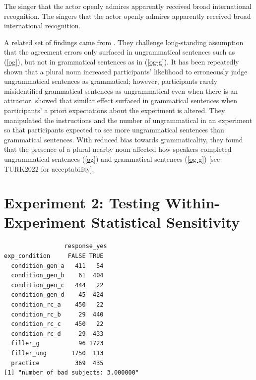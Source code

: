 \documentclass[
  authoryear,
  3p]{elsarticle}
\begin{document}
\begin{exe}
\ex \label{malsburg}
\begin{xlist}
\ex \label{malsburg-singer} The singer that the actor openly admires apparently received broad international recognition.
\ex \label{malsburg-singers} The singers that the actor openly admires apparently received broad international recognition.
\end{xlist}
\end{exe}

A related set of findings came from \citet{HammerlyEtAl2019}. They
challenge long-standing assumption that the agreement errors only
surfaced in ungrammatical sentences such as (\ref{og}), but not in
grammatical sentences as in (\ref{og-g}). It has been repeatedly shown
that a plural noun increased participants' likelihood to erroneously
judge ungrammatical sentences as grammatical; however, participants
rarely misidentified grammatical sentences as ungrammatical even when
there is an attractor. \citet{HammerlyEtAl2019} showed that similar
effect surfaced in grammatical sentences when participants' a priori
expectations about the experiment is altered. They manipulated the
instructions and the number of ungrammatical in an experiment so that
participants expected to see more ungrammatical sentences than
grammatical sentences. With reduced bias towards grammaticality, they
found that the presence of a plural nearby noun affected how speakers
completed ungrammatical sentences (\ref{og}) and grammatical sentences
(\ref{og-g}) {[}see TURK2022 for acceptability{]}.

\begin{exe}
\end{exe}

\section{Experiment 2: Testing Within-Experiment Statistical
Sensitivity}\label{experiment-2-testing-within-experiment-statistical-sensitivity}

\begin{verbatim}
                 response_yes
exp_condition     FALSE TRUE
  condition_gen_a   411   54
  condition_gen_b    61  404
  condition_gen_c   444   22
  condition_gen_d    45  424
  condition_rc_a    450   22
  condition_rc_b     29  440
  condition_rc_c    450   22
  condition_rc_d     29  433
  filler_g           96 1723
  filler_ung       1750  113
  practice          369  435
[1] "number of bad subjects: 3.000000"
\end{verbatim}
\end{document}
